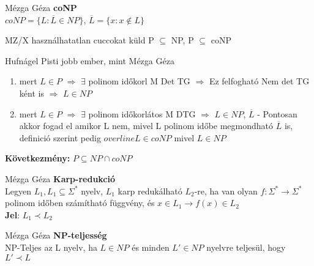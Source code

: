 \begin{definicio}{Mézga Géza}
	 \textbf{coNP} \\[3pt]
	 $coNP = \lbrace L : \overline{L} \in NP \rbrace$, $\overline{L} = \lbrace x : x \not\in L \rbrace$ \\[0pt]
\end{definicio}

	\begin{tetel}{MZ/X használhatatlan cuccokat küld}
   P $\subseteq$ NP, P $\subseteq$ coNP\\[4pt]
   \end{tetel}

\begin{bizonyitas}{Hufnágel Pisti jobb ember, mint Mézga Géza}

		\begin{enumerate}[itemsep=1mm]
			\item mert $L \in P$ $\Rightarrow$ $\exists$ polinom időkorl M Det TG $\Rightarrow$ Ez felfogható Nem det TG ként is $\Rightarrow$ $L \in NP$
			\item mert $L \in P$ $\Rightarrow$ $\exists$ polinom időkorlátos M DTG $\Rightarrow$ $L \in NP$, $\overline{L}$ - Pontosan akkor fogad el amikor L nem, mivel L polinom időbe megmondható $\overline{L}$ is, definició szerint pedig $overline{L} \in coNP$ mivel $L \in NP$
		\end{enumerate}

	 \textbf{Következmény:} $P\subseteq NP \cap coNP$\\[0pt]
\end{bizonyitas}

\begin{definicio}{Mézga Géza}
	 \textbf{Karp-redukció} \\[3pt]
	 Legyen $L_1,L_1 \subseteq \Sigma^*$ nyelv, $L_1$ karp redukálható $L_2$-re, ha van olyan $f: \Sigma^* \rightarrow \Sigma^*$ polinom időben számítható függvény, és $x \in L_1 \rightarrow f(x) \in L_2$\\[3pt]
	 \textbf{Jel}: $L_1 \prec L_2$ \\[0pt]
\end{definicio}

\begin{definicio}{Mézga Géza}
	 \textbf{NP-teljesség} \\[3pt]
	 NP-Teljes az L nyelv, ha $L\in NP$ és minden $L' \in NP$ nyelvre teljesül, hogy $L' \prec L$ \\[0pt]
\end{definicio}

